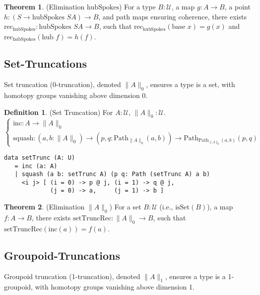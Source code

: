 \documentclass{article}
\theoremstyle{definition}
\newtheorem{theorem}{Theorem}
\newtheorem{definition}{Definition}
\begin{document}
\begin{theorem} (Elimination $\text{hubSpokes}$)
For a type $B : \mathcal{U}$, a map $g : A \to B$, a point $h : (S \to \text{hubSpokes } S A) \to B$, and path maps ensuring coherence, there exists $\text{rec}_{\text{hubSpokes}} : \text{hubSpokes } S A \to B$, such that $\text{rec}_{\text{hubSpokes}}(\text{base } x) = g(x)$ and $\text{rec}_{\text{hubSpokes}}(\text{hub } f) = h(f)$.
\end{theorem}

\newpage
\subsection{Set-Truncations}
Set truncation (0-truncation), denoted $\| A \|_0$, ensures a type is a set, with homotopy groups vanishing above dimension 0.

\begin{definition} (Set Truncation)
For $A : \mathcal{U}$, $\| A \|_0 : \mathcal{U}$.
\[
\begin{cases}
\text{inc} : A \to \| A \|_0 \\
\text{squash} : (a, b : \| A \|_0) \to (p, q : \text{Path}_{\| A \|_0}(a, b)) \to \text{Path}_{\text{Path}_{\| A \|_0}(a, b)}(p, q)
\end{cases}
\]
\begin{lstlisting}
data setTrunc (A: U)
   = inc (a: A)
   | squash (a b: setTrunc A) (p q: Path (setTrunc A) a b)
     <i j> [ (i = 0) -> p @ j, (i = 1) -> q @ j,
             (j = 0) -> a,     (j = 1) -> b ]
\end{lstlisting}
\end{definition}

\begin{theorem} (Elimination $\| A \|_0$)
For a set $B : \mathcal{U}$ (i.e., $\text{isSet}(B)$), a map $f : A \to B$, there exists $\text{setTruncRec} : \| A \|_0 \to B$, such that $\text{setTruncRec}(\text{inc}(a)) = f(a)$.
\end{theorem}

\subsection{Groupoid-Truncations}
Groupoid truncation (1-truncation), denoted $\| A \|_1$, ensures a type is a 1-groupoid, with homotopy groups vanishing above dimension 1.
\end{document}
